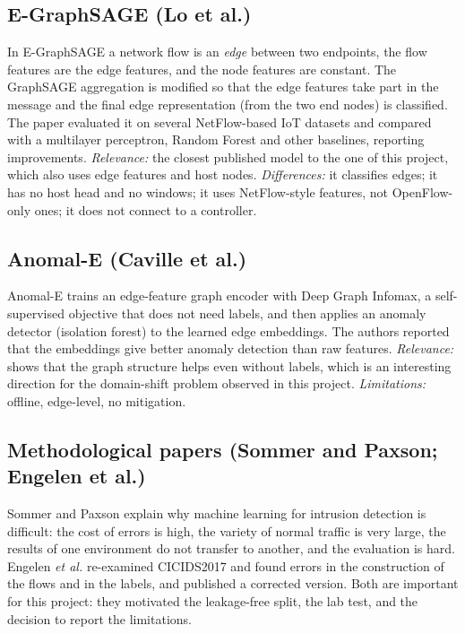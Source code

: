 \subsection{E-GraphSAGE (Lo et al.)}
In E-GraphSAGE \cite{bib:egraphsage} a network flow is an \emph{edge} between two endpoints, the flow features are the edge features, and the node features are constant. The GraphSAGE aggregation is modified so that the edge features take part in the message and the final edge representation (from the two end nodes) is classified. The paper evaluated it on several NetFlow-based IoT datasets and compared with a multilayer perceptron, Random Forest and other baselines, reporting improvements. \emph{Relevance:} the closest published model to the one of this project, which also uses edge features and host nodes. \emph{Differences:} it classifies edges; it has no host head and no windows; it uses NetFlow-style features, not OpenFlow-only ones; it does not connect to a controller.

\subsection{Anomal-E (Caville et al.)}
Anomal-E \cite{bib:anomale} trains an edge-feature graph encoder with Deep Graph Infomax, a self-supervised objective that does not need labels, and then applies an anomaly detector (isolation forest) to the learned edge embeddings. The authors reported that the embeddings give better anomaly detection than raw features. \emph{Relevance:} shows that the graph structure helps even without labels, which is an interesting direction for the domain-shift problem observed in this project. \emph{Limitations:} offline, edge-level, no mitigation.

\subsection{Methodological papers (Sommer and Paxson; Engelen et al.)}
Sommer and Paxson \cite{bib:sommer} explain why machine learning for intrusion detection is difficult: the cost of errors is high, the variety of normal traffic is very large, the results of one environment do not transfer to another, and the evaluation is hard. Engelen \emph{et al.} \cite{bib:engelen} re-examined CICIDS2017 and found errors in the construction of the flows and in the labels, and published a corrected version. Both are important for this project: they motivated the leakage-free split, the lab test, and the decision to report the limitations.

